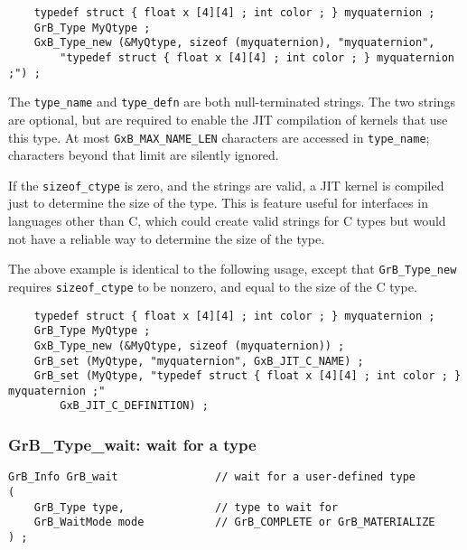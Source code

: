 \documentclass[12pt]{article}
\begin{document}
    {\footnotesize
    \begin{verbatim}
    typedef struct { float x [4][4] ; int color ; } myquaternion ;
    GrB_Type MyQtype ;
    GxB_Type_new (&MyQtype, sizeof (myquaternion), "myquaternion",
        "typedef struct { float x [4][4] ; int color ; } myquaternion ;") ; \end{verbatim}}

The \verb'type_name' and \verb'type_defn' are both null-terminated strings.
The two strings are optional, but are
required to enable the JIT compilation of kernels that use this type.
At most \verb'GxB_MAX_NAME_LEN' characters are accessed in \verb'type_name';
characters beyond that limit are silently ignored.

If the \verb'sizeof_ctype' is zero, and the strings are valid, a
JIT kernel is compiled just to determine the size of the type.  This is
feature useful for interfaces in languages other than C, which could create
valid strings for C types but would not have a reliable way to determine the
size of the type.

The above example is identical to the following usage, except that
\verb'GrB_Type_new' requires \verb'sizeof_ctype' to be nonzero, and equal
to the size of the C type.

    {\footnotesize
    \begin{verbatim}
    typedef struct { float x [4][4] ; int color ; } myquaternion ;
    GrB_Type MyQtype ;
    GxB_Type_new (&MyQtype, sizeof (myquaternion)) ;
    GrB_set (MyQtype, "myquaternion", GxB_JIT_C_NAME) ;
    GrB_set (MyQtype, "typedef struct { float x [4][4] ; int color ; } myquaternion ;"
        GxB_JIT_C_DEFINITION) ; \end{verbatim}}

\subsubsection{{\sf GrB\_Type\_wait:} wait for a type}
\label{type_wait}

\begin{mdframed}[userdefinedwidth=6in]
{\footnotesize
\begin{verbatim}
GrB_Info GrB_wait               // wait for a user-defined type
(
    GrB_Type type,              // type to wait for
    GrB_WaitMode mode           // GrB_COMPLETE or GrB_MATERIALIZE
) ;
\end{verbatim}
}\end{mdframed}
\end{document}
